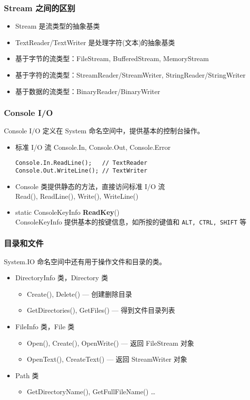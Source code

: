 \begin{frame}
\frametitle{Stream 之间的区别}
\begin{itemize}
\setlength{\itemsep}{6pt plus 1pt}
\item Stream 是流类型的抽象基类
\item TextReader/TextWriter 是处理字符(文本)的抽象基类
\item 基于字节的流类型：{\small FileStream, BufferedStream, MemoryStream}
\item 基于字符的流类型：{\small StreamReader/StreamWriter, StringReader/StringWriter}
\item 基于数据的流类型：{\small BinaryReader/BinaryWriter}
\end{itemize}
\begin{figure}
  \centering
  
\end{figure}
\end{frame}

\begin{frame}[fragile]
\frametitle{Console I/O}
\CJKindent Console I/O 定义在 System 命名空间中，提供基本的控制台操作。
\begin{itemize}
\item 标准 I/O 流 Console.In, Console.Out, Console.Error
\begin{lstlisting}
Console.In.ReadLine();   // TextReader
Console.Out.WriteLine(); // TextWriter
\end{lstlisting}
\item Console 类提供静态的方法，直接访问标准 I/O 流\\
Read(), ReadLine(), Write(), WriteLine()

\item static ConsoleKeyInfo \textbf{ReadKey}() \\
ConsoleKeyInfo 提供基本的按键信息，如所按的键值和 \texttt{ALT, CTRL, SHIFT} 等
\end{itemize}
\end{frame}

\begin{frame}
\frametitle{目录和文件}
\CJKindent System.IO 命名空间中还有用于操作文件和目录的类。
\begin{itemize}
\item DirectoryInfo 类，Directory 类
\begin{itemize}
\item Create(), Delete() --- 创建删除目录
\item GetDirectories(), GetFiles() --- 得到文件目录列表
\end{itemize}
\item FileInfo 类，File 类
\begin{itemize}
\item Open(), Create(), OpenWrite() --- 返回 FileStream 对象
\item OpenText(), CreateText() --- 返回 StreamWriter 对象
\end{itemize}
\item Path 类
\begin{itemize}
\item GetDirectoryName(), GetFullFileName() \dots
\end{itemize}
\end{itemize}
\end{frame}

